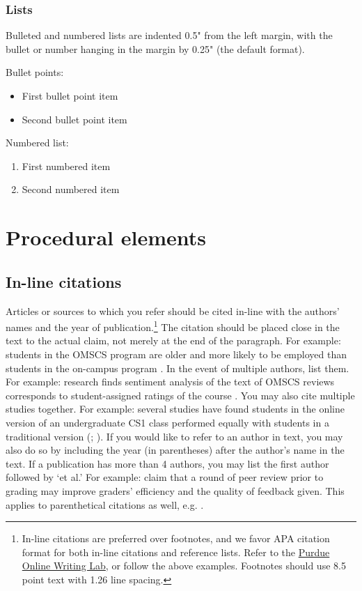 \documentclass[
	letterpaper, %
]{jdf}
\begin{document}
\begin{Abstract}
\subsubsection{Lists}
Bulleted and numbered lists are indented 0.5" from the left margin, with the bullet or number hanging in the margin by 0.25" (the default format).

Bullet points:

\begin{itemize}
	\item First bullet point item
	\item Second bullet point item
\end{itemize}

Numbered list:

\begin{enumerate}
	\item First numbered item
	\item Second numbered item
\end{enumerate}

\section{Procedural elements}
\subsection{In-line citations}
Articles or sources to which you refer should be cited in-line with the authors’ names and the year of publication.\footnote{In-line citations are preferred over footnotes, and we favor APA citation format for both in-line citations and reference lists. Refer to the \href{https://owl.purdue.edu/owl/research_and_citation/apa_style/apa_formatting_and_style_guide/in_text_citations_the_basics.html}{Purdue Online Writing Lab}, or follow the above examples. Footnotes should use 8.5 point text with 1.26 line spacing.} The citation should be placed close in the text to the actual claim, not merely at the end of the paragraph. For example: students in the OMSCS program are older and more likely to be employed than students in the on-campus program \citep{joyner2017}. In the event of multiple authors, list them. For example: research finds sentiment analysis of the text of OMSCS reviews corresponds to student-assigned ratings of the course \citep{newman2018}. You may also cite multiple studies together. For example: several studies have found students in the online version of an undergraduate CS1 class performed equally with students in a traditional version (\cite{joyner2018a}; \cite{joyner2018b}). If you would like to refer to an author in text, you may also do so by including the year (in parentheses) after the author’s name in the text. If a publication has more than 4 authors, you may list the first author followed by ‘et al.’ For example:  claim that a round of peer review prior to grading may improve graders’ efficiency and the quality of feedback given. This applies to parenthetical citations as well, e.g. \citep{joyner2016}.


\end{Abstract}
\end{document}
